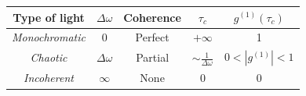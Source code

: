 \begin{table}[H]
\centering
\begin{tabular}{@{}ccccc@{}}
\toprule
\textbf{Type of light} & $\Delta \omega$ & \textbf{Coherence} & $\tau_c$                       & $g^{(1)}(\tau_c)$ \\ \midrule
\textit{Monochromatic} & 0               & Perfect            & $+\infty$                      & 1                 \\[0.75ex]
\textit{Chaotic}       & $\Delta \omega$ & Partial            & $\sim \frac{1}{\Delta \omega}$ & $0<|g^{(1)}|<1$   \\[0.75ex]
\textit{Incoherent}    & $\infty$        & None               & 0                              & 0                 \\ \bottomrule
\end{tabular}
\end{table}